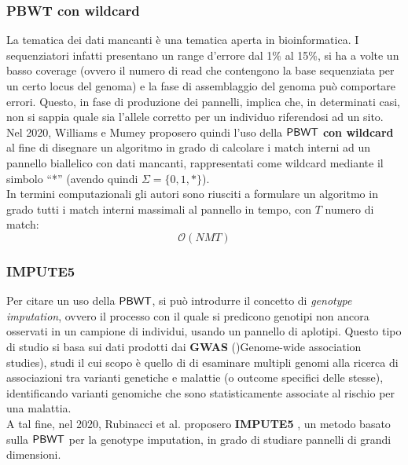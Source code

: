 \subsubsection{PBWT con wildcard}
La tematica dei dati mancanti è una tematica aperta in
bioinformatica. I sequenziatori infatti presentano un range d'errore
dal 1\% al 15\%, si ha a volte un basso coverage (ovvero il numero di
read che contengono la base sequenziata per un certo locus del genoma) e la fase
di assemblaggio del genoma può comportare errori. Questo, in fase di produzione
dei pannelli, implica che, in determinati casi, non si sappia quale sia l'allele
corretto per un individuo riferendosi ad un sito. \\
Nel 2020, Williams e Mumey \cite{williams} proposero quindi l'uso della
$\mbox{\rm {\sf PBWT}}$ \textbf{con 
  wildcard} al fine di disegnare un algoritmo in grado di calcolare i match
interni ad un pannello biallelico con dati mancanti, rappresentati come
wildcard mediante il simbolo ``*'' (avendo quindi
$\Sigma=\{0,1,*\}$).\\ 
In termini computazionali gli autori sono riusciti a formulare un algoritmo in
grado tutti i match interni massimali al pannello in
tempo, con $T$ numero di match: 
\begin{equation}
  \label{eq:pbwtwild}
  \mathcal{O}(NMT)
\end{equation}
\subsubsection{IMPUTE5}
Per citare un uso della $\mbox{\rm {\sf PBWT}}$, si può introdurre il concetto di
\textit{genotype 
  imputation}, ovvero il processo con il quale si predicono genotipi non ancora
osservati in un campione di individui, usando un pannello di aplotipi. Questo
tipo di studio si basa sui dati prodotti dai \textbf{GWAS} ()Genome-wide
    association studies), studi il cui scopo è quello di di esaminare multipli
genomi alla ricerca di associazioni tra varianti genetiche e malattie (o
outcome specifici delle stesse), identificando varianti genomiche che sono
statisticamente associate al rischio per una malattia.\\ 
A tal fine, nel 2020, Rubinacci et al. proposero \textbf{IMPUTE5}
\cite{impute5}, un metodo basato sulla $\mbox{\rm {\sf PBWT}}$ per la genotype
  imputation, in grado di studiare pannelli di grandi dimensioni.
